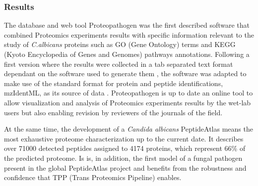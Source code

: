 \subsubsection*{Results}
The database and web tool Proteopathogen was the first described software 
that combined Proteomics experiments results with specific information 
relevant to the study of \textit{C.albicans} proteins such as GO (Gene Ontology)
terms and KEGG (Kyoto Encyclopedia of Genes and Genomes) pathways annotations.
Following a first version where the results were collected
in a tab separated text format dependant on the software used to generate 
them \citep{Vialas2009b}, the software was adapted to make use of
the standard format for protein and peptide identifications, mzIdentML, as its source of data
\citep{Vialas2015}. Proteopathogen is up to date an online tool to allow
visualization and analysis of Proteomics experiments results by the wet-lab 
users but also enabling revision by reviewers of the journals of the field.

At the same time, the development of a \textit{Candida albicans} PeptideAtlas
means the most exhaustive proteome characterization up to the current date.
It describes over 71000 detected peptides assigned to 4174 proteins, which
represent 66\% of the predicted proteome. Is is, in addition, the first 
model of a fungal pathogen present in the global PeptideAtlas project and
benefits from the robustness and confidence that TPP (Trans Proteomics Pipeline)
enables.

\endinput
